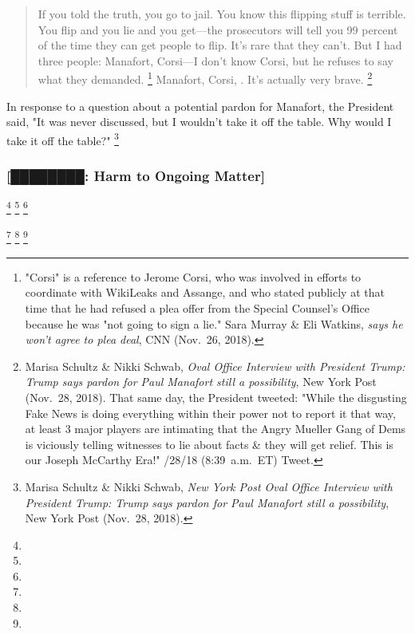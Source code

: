 {\begin{quote}
If you told the truth, you go to jail.
You know this flipping stuff is terrible.
You flip and you lie and you get---the prosecutors will tell you 99 percent of the time they can get people to flip.
It's rare that they can't.
But I had three people: Manafort, Corsi---I don't know Corsi, but he refuses to say what they demanded.%
\footnote{"Corsi" is a reference to Jerome Corsi,  who was involved in efforts to coordinate with WikiLeaks and Assange, and who stated publicly at that time that he had refused a plea offer from the Special Counsel's Office because he was "not going to sign a lie."
Sara Murray \& Eli Watkins,  \textit{says he won't agree to plea deal}, CNN (Nov.~26, 2018).}
Manafort, Corsi, .
It's actually very brave.%
\footnote{Marisa Schultz \& Nikki Schwab, \textit{Oval Office Interview with President Trump: Trump says pardon for Paul Manafort still a possibility}, New York Post (Nov.~28, 2018).
That same day, the President tweeted: "While the disgusting Fake News is doing everything within their power not to report it that way, at least 3 major players are intimating that the Angry Mueller Gang of Dems is viciously telling witnesses to lie about facts \& they will get relief.
This is our Joseph McCarthy Era!" /28/18 (8:39~a.m.~ET) Tweet.}
\end{quote}

In response to a question about a potential pardon for Manafort, the President said, "It was never discussed, but I wouldn't take it off the table.
Why would I take it off the table?"%
\footnote{Marisa Schultz \& Nikki Schwab, \textit{New York Post Oval Office Interview with President Trump: Trump says pardon for Paul Manafort still a possibility}, New York Post (Nov.~28, 2018).}

\subsubsection{[████████: Harm to Ongoing Matter]}

\footnote{}
\footnote{}
\footnote{}

\footnote{}
\footnote{}
\footnote{}

}
